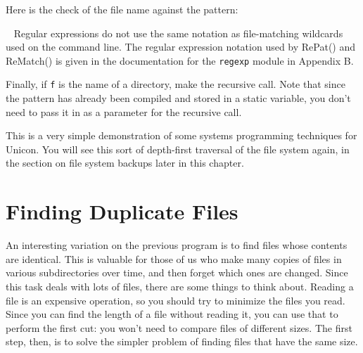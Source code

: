 
Here is the check of the file name against the pattern:


\bigskip{}\
{\sffamily
Regular expressions do not use the same notation as file-matching
wildcards used on the command line. The regular expression notation
used by RePat() and ReMatch() is given in the documentation for the
\texttt{regexp} module in Appendix B.}

Finally, if \texttt{f} is the name of a directory, make the recursive
call. Note that since the pattern has already been compiled and stored
in a static variable, you don't need to pass it in as
a parameter for the recursive call.


This is a very simple demonstration of some systems programming
techniques for Unicon. You will see this sort of depth-first traversal
of the file system again, in the section on file system backups later
in this chapter.

\section{Finding Duplicate Files}

An interesting variation on the previous program is to find files whose
contents are identical. This is valuable for those of us who make many
copies of files in various subdirectories over time, and then forget
which ones are changed. Since this task deals with lots of files, there
are some things to think about. Reading a file is an expensive
operation, so you should try to minimize the files you read. Since you
can find the length of a file without reading it, you can use that to
perform the first cut: you won't need to compare files
of different sizes. The first step, then, is to solve the simpler
problem of finding files that have the same size.

